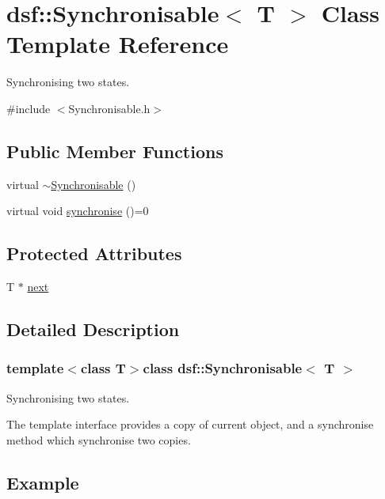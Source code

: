 \hypertarget{classdsf_1_1_synchronisable}{}\section{dsf\+:\+:Synchronisable$<$ T $>$ Class Template Reference}
\label{classdsf_1_1_synchronisable}


Synchronising two states.  




{\ttfamily \#include $<$Synchronisable.\+h$>$}

\subsection*{Public Member Functions}
\begin{DoxyCompactItemize}
\item 
virtual \hyperlink{classdsf_1_1_synchronisable_ae733344b5ac5742826aa4781abdc6e2c}{$\sim$\+Synchronisable} ()
\item 
virtual void \hyperlink{classdsf_1_1_synchronisable_a225f9a5f6cb47d73e1ea4d788bbfcaaa}{synchronise} ()=0
\end{DoxyCompactItemize}
\subsection*{Protected Attributes}
\begin{DoxyCompactItemize}
\item 
T $\ast$ \hyperlink{classdsf_1_1_synchronisable_ae2434faac15d3184da1543a91e175713}{next}
\end{DoxyCompactItemize}


\subsection{Detailed Description}
\subsubsection*{template$<$class T$>$class dsf\+::\+Synchronisable$<$ T $>$}

Synchronising two states. 

The template interface provides a copy of current object, and a synchronise method which synchronise two copies. \hypertarget{classdsf_1_1_synchronized_object_Example}{}\subsection{Example}\label{classdsf_1_1_synchronized_object_Example}

